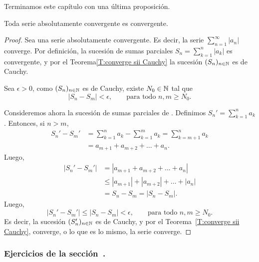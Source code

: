 Terminamos este capítulo con una última proposición.

\begin{proposition}
    Toda serie absolutamente convergente es convergente.
\end{proposition}

\begin{proof}
    Sea \seriean una serie absolutamente convergente. Es decir, la serie $\sum_{n=1}^\infty |a_n|$ converge. Por definición, la sucesión de sumas parciales $S_n = \sum_{k=1}^n |a_k|$ es convergente, y por el Teorema\ref{T:converge sii Cauchy} la sucesión $(S_n)_{n\in\mathbb{N}}$ es de Cauchy. 
    
    Sea $\epsilon > 0$, como $(S_n)_{n\in\mathbb{N}}$ es de Cauchy, existe $N_0\in\mathbb{N}$ tal que 
    \[
    |S_n - S_m| < \epsilon, \qquad \text{para todo $n,m\ge N_0$}.
    \]

    Consideremos ahora la sucesión de sumas parciales de \seriean. Definimos $S_n' = \sum_{k=1}^n a_k$. Entonces, si $n>m$,
    \begin{align*}
    S_n' - S_m' &= \sum_{k=1}^n a_k - \sum_{k=1}^m a_k
    = \sum_{k=m+1}^n a_k \\
    &= a_{m+1} + a_{m+2} + \dots + a_n.
    \end{align*}
    Luego,
    \begin{align*}
    |S_n' - S_m'| 
    &= |a_{m+1} + a_{m+2} + \dots + a_n|
    \\
    &\le |a_{m+1}| + |a_{m+2}| + \dots + |a_n| 
    \\
    &= S_n - S_m = |S_n - S_m|.
    \end{align*}
    Luego, 
    \[
    |S_n' - S_m'| 
    \le |S_n - S_m| < \epsilon,
    \qquad \text{para todo $n,m\ge N_0$}.
    \]
    Es decir, la sucesión $(S_n')_{n\in\mathbb{N}}$ es de Cauchy, y por el Teorema~\ref{T:converge sii Cauchy}, converge, o lo que es lo mismo, la serie \seriean converge.
\end{proof}



\subsubsection*{Ejercicios de la sección~.}

\begin{enumerate}

\end{enumerate}

\begin{comment}
\section{Desarrollos decimales (???)}


\subsubsection*{Ejercicios de la sección~\getcurrentref{chapter}.\getcurrentref{section}}

\begin{enumerate}
\item 
\end{enumerate}
\end{comment}

